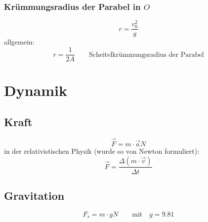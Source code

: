 \subsubsection{Kr\"ummungsradius der Parabel in $O$}
\begin{equation}
	r=\frac{v_0^2}{g}
\end{equation}
\noindent allgemein:
\begin{equation}
	r=\frac{1}{2A}\qquad\text{Scheitelkr\"ummungsradius der Parabel}
\end{equation}

\section{Dynamik}

\subsection{Kraft}
\begin{equation}
	\overrightarrow{F}=m\cdot\overrightarrow{a}\unit{N}
\end{equation}
\noindent in der relativistischen Physik (wurde so von Newton formuliert):
\begin{equation}
	\overrightarrow{F}=\frac{\Delta (m\cdot \overrightarrow{v})}{\Delta t}
\end{equation}

\subsection{Gravitation}
\begin{equation}
	F_s=m\cdot g\unit{N}\qquad\text{mit}\quad g=9.81
\end{equation}


